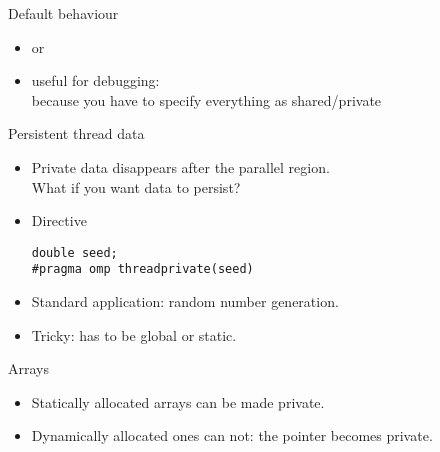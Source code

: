 \begin{numberedframe}{Default behaviour}
  \begin{itemize}
  \item {} or 
  \item useful for debugging: \\ because you have
    to specify everything as shared/private
  \end{itemize}
\end{numberedframe}

\begin{numberedframe}{Persistent thread data}
  \begin{itemize}
  \item Private data disappears after the parallel region.\\
    What if you want data to persist?
  \item Directive 
\begin{lstlisting}
double seed;
#pragma omp threadprivate(seed)
\end{lstlisting}
\item Standard application: random number generation.
\item Tricky: has to be global or static.
  \end{itemize}
\end{numberedframe}

\begin{numberedframe}{Arrays}
  \begin{itemize}
  \item Statically allocated arrays can be made private.
  \item Dynamically allocated ones can not: the pointer becomes private.
  \end{itemize}
\end{numberedframe}

\endinput

\begin{numberedframe}{}
  \begin{itemize}
  \item 
  \end{itemize}
\end{numberedframe}

